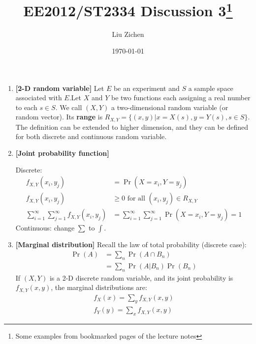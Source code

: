 \documentclass[a4paper]{article}
\title{EE2012/ST2334 Discussion 3\footnote{Some examples from bookmarked pages of the lecture notes}}
\author{Liu Zichen}
\date{\today}
\begin{document}
\maketitle

\begin{enumerate}

\item
\textbf{[2-D random variable]}
Let $E$ be an experiment and $S$ a sample space associated with $E$.Let $X$ and $Y$ be two functions each assigning a real number to each $s \in S$. We call $(X, Y)$ a two-dimensional random variable (or random vector). Its \textbf{range} is $R_{X, Y}=\{(x, y) | x=X(s), y=Y(s), s \in S\}$. The definition can be extended to higher dimension, and they can be defined for both discrete and continuous random variable.

\item
\textbf{[Joint probability function]}

Discrete:
\begin{equation}
\begin{split}
    f_{X, Y}\left(x_{i}, y_{j}\right) & = 
    \operatorname{Pr}\left(X=x_{i}, Y=y_{j}\right) \\
    f_{X, Y}\left(x_{i}, y_{j}\right) & \geq 0 \text{ for all } (x_i, y_j) \in R_{X, Y}\\
    \sum_{i=1}^{\infty} \sum_{j=1}^{\infty} f_{X, Y}\left(x_{i}, y_{j}\right)& =\sum_{i=1}^{\infty} \sum_{j=1}^{\infty} \operatorname{Pr}\left(X=x_{i}, Y=y_{j}\right)=1
\end{split}
\end{equation}
Continuous: change $\sum$ to $\int$.

\item
\textbf{[Marginal distribution]}
Recall the law of total probability (discrete case):
\begin{equation}
    \begin{split}
        \operatorname{Pr}(A)
        &=\sum_{n} \operatorname{Pr}\left(A \cap B_{n}\right) \\
        &=\sum_{n} \operatorname{Pr}(A | B_{n}) \operatorname{Pr}\left(B_{n}\right)
    \end{split}
\end{equation}
If $(X, Y)$ is a 2-D discrete random variable, and its joint probability is $f_{X, Y}(x, y)$, the marginal distributions are:
\begin{equation}
    \begin{split}
        f_{X}(x)=\sum_{y} f_{X, Y}(x, y) \\
        f_{Y}(y)=\sum_{x} f_{X, Y}(x, y)
    \end{split}
\end{equation}


\end{enumerate}
\end{document}
